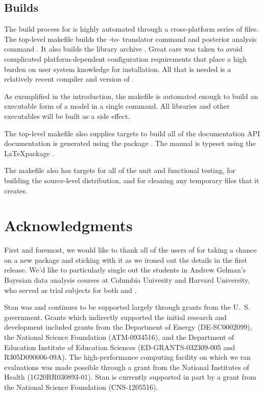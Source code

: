 \documentclass[article]{jss}
\begin{document}
\subsection{Builds}

The build process for  is highly automated through a
cross-platform series of  files.  The top-level makefile
builds the -to- translator command
 and posterior analysis command .  It
also builds the library archive .  Great care was
taken to avoid complicated platform-dependent configuration
requirements that place a high burden on user system knowledge for
installation.  All that is needed is a relatively recent
 compiler and version of .

As exemplified in the introduction, the makefile is automated enough
to build an executable form of a  model in a single
command.  All libraries and other executables will be built as a side
effect.  

The top-level makefile also supplies targets to build all of the
documentation  API documentation is generated using the
 package \citep{Doxygen:2011}.  The 
manual \citep{Stan:2013} is typeset using the \LaTeX package
\citep{MittelbachEtAl:2004}.

The makefile also has targets for all of the unit and functional
testing, for building the source-level distribution, and for cleaning
any temporary files that it creates.

\section*{Acknowledgments}

First and foremost, we would like to thank all of the users of
 for taking a chance on a new package and sticking with
it as we ironed out the details in the first release.  We'd like to
particularly single out the students in Andrew Gelman's Bayesian data
analysis courses at Columbia Univesity and Harvard University, who
served as trial subjects for both  and \cite{GelmanEtAl:2013}.

Stan was and continues to be supported largely through grants from the
U.~S. government.  Grants which indirectly supported the initial
research and development included grants from the Department of Energy
(DE-SC0002099), the National Science Foundation (ATM-0934516), and the
Department of Education Institute of Education Sciences
(ED-GRANTS-032309-005 and R305D090006-09A).  The high-performance
computing facility on which we ran evaluations was made possible
through a grant from the National Institutes of Health
(1G20RR030893-01).  Stan is currently supported in part by a grant
from the National Science Foundation (CNS-1205516).
\end{document}
